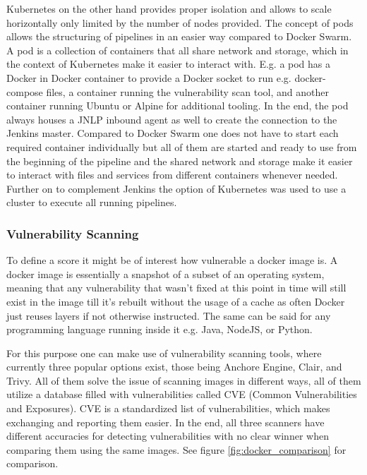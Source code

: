 Kubernetes on the other hand provides proper isolation and allows to scale horizontally only limited by the number of nodes provided. The concept of pods allows the structuring of pipelines in an easier way compared to Docker Swarm. A pod is a collection of containers that all share network and storage, which in the context of Kubernetes make it easier to interact with. E.g. a pod has a Docker in Docker container to provide a Docker socket to run e.g. docker-compose files, a container running the vulnerability scan tool, and another container running Ubuntu or Alpine for additional tooling. In the end, the pod always houses a JNLP inbound agent as well to create the connection to the Jenkins master. Compared to Docker Swarm one does not have to start each required container individually but all of them are started and ready to use from the beginning of the pipeline and the shared network and storage make it easier to interact with files and services from different containers whenever needed.
Further on to complement Jenkins the option of Kubernetes was used to use a cluster to execute all running pipelines.

\subsubsection{Vulnerability Scanning}
\label{sec:vulnerability_scanning}
To define a score it might be of interest how vulnerable a docker image is. A docker image is essentially a snapshot of a subset of an operating system, meaning that any vulnerability that wasn't fixed at this point in time will still exist in the image till it's rebuilt without the usage of a cache as often Docker just reuses layers if not otherwise instructed. The same can be said for any programming language running inside it e.g. Java, NodeJS, or Python.

For this purpose one can make use of vulnerability scanning tools, where currently three popular options exist, those being Anchore Engine, Clair, and Trivy. 
All of them solve the issue of scanning images in different ways, all of them utilize a database filled with vulnerabilities called CVE (Common Vulnerabilities and Exposures). CVE is a standardized list of vulnerabilities, which makes exchanging and reporting them easier.
In the end, all three scanners have different accuracies for detecting vulnerabilities with no clear winner when comparing them using the same images. See figure \ref{fig:docker_comparison} for comparison. 

